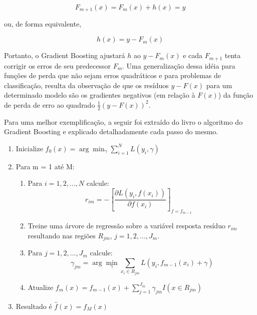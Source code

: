\begin{equation}
F_{m + 1}(x) = F_{m}(x) + h(x) = y
\end{equation}

ou, de forma equivalente,

\begin{equation}
h(x) = y - F_{m}(x)
\end{equation}

Portanto, o Gradient Boosting ajustará $ h $ ao $ y - F_{m}(x) $ e cada $ F_{m + 1} $ tenta corrigir os erros de seu predecessor $ F_{m} $. Uma generalização dessa idéia para funções de perda que não sejam erros quadráticos e para problemas de classificação, resulta da observação de que os resíduos $ y - F(x) $ para um determinado modelo são os gradientes negativos (em relação à $ F(x) $) da função de perda de erro ao quadrado $ \frac{1}{2} (y - F(x))^{2} $.

Para uma melhor exemplificação, a seguir foi extraído do livro \citet{Hastie2001} o algoritmo do Gradient Boosting e explicado detalhadamente cada passo do mesmo.

\begin{enumerate}
	\item Inicialize $ f_0(x) = \arg \min_{\gamma} \sum^{N}_{i=1} L(y_i, \gamma) $
	\item Para m = 1 até M:
	\begin{enumerate}
    	\item Para $ i = 1,2,...,N $ calcule:
        	\begin{equation}
        	    r_{im} = -\left[\frac{\partial L(y_i, f(x_i))}{\partial f(x_i)}\right]_{f=f_{m-1}} \quad
        	\end{equation}
    	\item Treine uma árvore de regressão sobre a variável resposta resíduo $ r_{im} $ resultando nas regiões $ R_{jm} $, $ j = 1,2,...,J_m $.
    	\item Para $ j = 1,2,...,J_m $ calcule:
    	    \begin{equation}
    	        \gamma_{jm} = \arg \min_{\gamma} \sum_{x_i \in R_{jm}} L(y_i, f_{m-1}(x_i) + \gamma)
    	    \end{equation}
    	\item Atualize $ f_{m}(x) = f_{{m-1}}(x)+ \sum_{j=1}^{J_m} \gamma_{jm} I(x \in R_{jm}) $
	\end{enumerate}
	\item Resultado é $ \hat{f}(x) = f_M(x) $
\end{enumerate}

